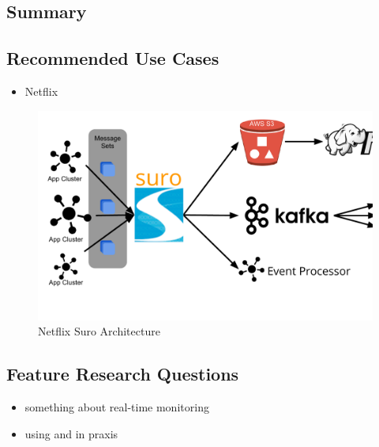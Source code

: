 \subsection{Summary}

\subsection{Recommended Use Cases}
\begin{itemize}
  \item Netflix
\end{itemize}

\begin{figure}[hbt]
  \centering
  \includegraphics[width=\linewidth,clip=true,trim=5mm 2cm 0 5mm]{images/NetflixSuro}
  \caption{Netflix Suro Architecture~\cite{Bae2013, Harris2013}}
  \label{fig:SuroArchitecture}
\end{figure}


\subsection{Feature Research Questions}
\begin{itemize}
  \item something about real-time monitoring
  \item using \chuk and \amb in praxis
\end{itemize}